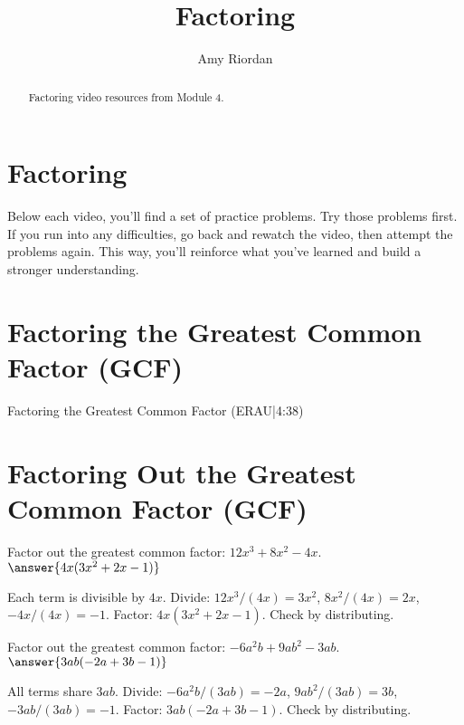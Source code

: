 \documentclass{ximera}
\title{Factoring}
\author{Amy Riordan}
\begin{document}
\begin{abstract}
Factoring video resources from Module 4.
\end{abstract}
\maketitle

\section*{Factoring}

Below each video, you’ll find a set of practice problems. Try those problems first. If you run into any difficulties, go back and rewatch the video, then attempt the problems again. This way, you’ll reinforce what you’ve learned and build a stronger understanding.

\section*{Factoring the Greatest Common Factor (GCF)}

Factoring the Greatest Common Factor (ERAU|4:38)



\section*{Factoring Out the Greatest Common Factor (GCF)}

\begin{problem}
Factor out the greatest common factor: \(12x^3 + 8x^2 - 4x\). $\answer{4x(3x^2 + 2x - 1)}$
\begin{feedback}
Each term is divisible by \(4x\). Divide: \(12x^3/(4x)=3x^2\), \(8x^2/(4x)=2x\), \(-4x/(4x)=-1\). Factor: \(4x(3x^2+2x-1)\). Check by distributing.
\end{feedback}
\end{problem}

\begin{problem}
Factor out the greatest common factor: \(-6a^2b + 9ab^2 - 3ab\). $\answer{3ab(-2a + 3b - 1)}$
\begin{feedback}
All terms share \(3ab\). Divide: \(-6a^2b/(3ab)=-2a\), \(9ab^2/(3ab)=3b\), \(-3ab/(3ab)=-1\). Factor: \(3ab(-2a+3b-1)\). Check by distributing.
\end{feedback}
\end{problem}
\end{document}
